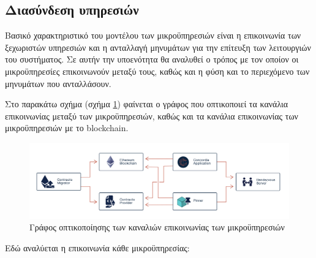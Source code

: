 \subsection{Διασύνδεση υπηρεσιών} \label{subsection:4-3-8-service-communication}

Βασικό χαρακτηριστικό του μοντέλου των μικροϋπηρεσιών είναι η επικοινωνία των ξεχωριστών υπηρεσιών και η ανταλλαγή μηνυμάτων για την επίτευξη των λειτουργιών του συστήματος. Σε αυτήν την υποενότητα θα αναλυθεί ο τρόπος με τον οποίον οι μικροϋπηρεσίες επικοινωνούν μεταξύ τους, καθώς και η φύση και το περιεχόμενο των μηνυμάτων που ανταλλάσουν.

Στο παρακάτω σχήμα (σχήμα \ref{figure:4-3-communications-graph}) φαίνεται ο γράφος που οπτικοποιεί τα κανάλια επικοινωνίας μεταξύ των μικροϋπηρεσιών, καθώς και τα κανάλια επικοινωνίας των μικροϋπηρεσιών με το blockchain.

\begin{figure}[H]
    \centering
    \includegraphics[width=\textwidth]{assets/figures/chapter-4/4.3.communications-diagram}
    \caption{Γράφος οπτικοποίησης των καναλιών επικοινωνίας των μικροϋπηρεσιών}
    \label{figure:4-3-communications-graph}
\end{figure}

Εδώ αναλύεται η επικοινωνία κάθε μικροϋπηρεσίας:

